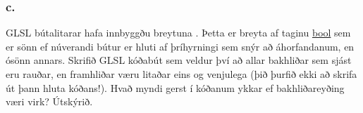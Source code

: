 \documentclass{article}
\begin{document}
\subsubsection{c.}GLSL bútalitarar hafa innbyggðu breytuna . Þetta er
breyta af taginu \underline{bool} sem er sönn ef núverandi bútur er hluti af þríhyrningi
sem snýr að áhorfandanum, en ósönn annars. Skrifið GLSL kóðabút sem
veldur því að allar bakhliðar sem sjást eru rauðar, en framhliðar væru litaðar
eins og venjulega (þið þurfið ekki að skrifa út þann hluta kóðans!). Hvað
myndi gerst í kóðanum ykkar ef bakhliðareyðing væri virk? Útskýrið.
\end{document}
